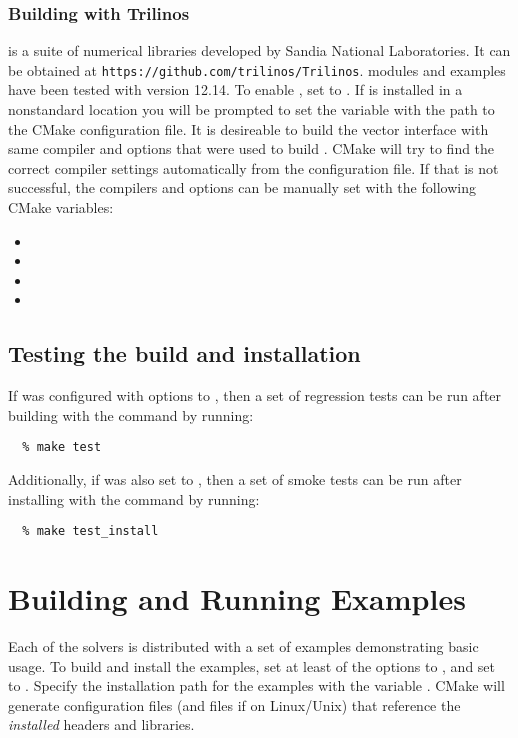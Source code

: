 \subsubsection*{Building with Trilinos}
{\trilinos} is a suite of numerical libraries developed by Sandia National
Laboratories. It can be obtained at {\tt https://github.com/trilinos/Trilinos}.
{\sundials} {\trilinos} modules and examples have been tested with {\trilinos}
version 12.14. To enable {\trilinos}, set
 to . If {\trilinos} is
installed in a nonstandard location you will be prompted to set the
variable  with the path to the {\trilinos} CMake
configuration file. It is desireable to build the {\trilinos} vector interface
with same compiler and options that were used to build {\trilinos}.
CMake will try to find the correct compiler settings automatically from the
{\trilinos} configuration file. If that is not successful,
the compilers and options can be manually set with the following CMake variables:
\begin{itemize}
\item
{}
\item
{}
\item
{}
\item
{}
\end{itemize}

\subsection{Testing the build and installation}

If {\sundials} was configured with
 options to , then a set of
regression tests can be run after building with the  command
by running:
\begin{verbatim}
  % make test
\end{verbatim}
Additionally, if  was also set to , then
a set of smoke tests can be run after installing with the 
command by running:
\begin{verbatim}
  % make test_install
\end{verbatim}

\section{Building and Running Examples}
Each of the {\sundials} solvers is distributed with a set of examples
demonstrating basic usage. To build and install the examples, set at
least of the  options to , and
set  to .
Specify the installation path for the examples with the variable . CMake will generate
 configuration files (and  files if on Linux/Unix) that reference the
{\em installed} {\sundials} headers and libraries.

